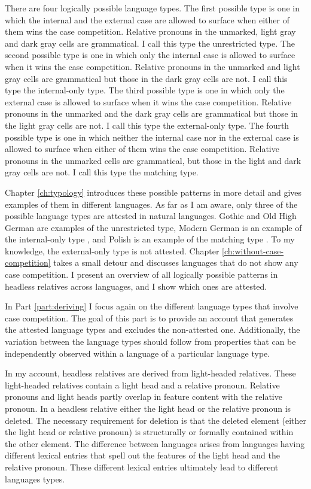 There are four logically possible language types. The first possible type is one in which the internal and the external case are allowed to surface when either of them wins the case competition. Relative pronouns in the unmarked, light gray and dark gray cells are grammatical. I call this type the unrestricted type. The second possible type is one in which only the internal case is allowed to surface when it wins the case competition. Relative pronouns in the unmarked and light gray cells are grammatical but those in the dark gray cells are not. I call this type the internal-only type. The third possible type is one in which only the external case is allowed to surface when it wins the case competition. Relative pronouns in the unmarked and the dark gray cells are grammatical but those in the light gray cells are not. I call this type the external-only type. The fourth possible type is one in which neither the internal case nor in the external case is allowed to surface when either of them wins the case competition. Relative pronouns in the unmarked cells are grammatical, but those in the light and dark gray cells are not. I call this type the matching type.

Chapter \ref{ch:typology} introduces these possible patterns in more detail and gives examples of them in different languages. As far as I am aware, only three of the possible language types are attested in natural languages. Gothic and Old High German are examples of the unrestricted type, Modern German is an example of the internal-only type \citep{vogel2001}, and Polish is an example of the matching type \citep{citko2013}. To my knowledge, the external-only type is not attested.
Chapter \ref{ch:without-case-competition} takes a small detour and discusses languages that do not show any case competition. I present an overview of all logically possible patterns in headless relatives across languages, and I show which ones are attested.

In Part \ref{part:deriving} I focus again on the different language types that involve case competition. The goal of this part is to provide an account that generates the attested language types and excludes the non-attested one. Additionally, the variation between the language types should follow from properties that can be independently observed within a language of a particular language type.

In my account, headless relatives are derived from light-headed relatives. These light-headed relatives contain a light head and a relative pronoun. Relative pronouns and light heads partly overlap in feature content with the relative pronoun. In a headless relative either the light head or the relative pronoun is deleted. The necessary requirement for deletion is that the deleted element (either the light head or relative pronoun) is structurally or formally contained within the other element.
The difference between languages arises from languages having different lexical entries that spell out the features of the light head and the relative pronoun. These different lexical entries ultimately lead to different languages types.

